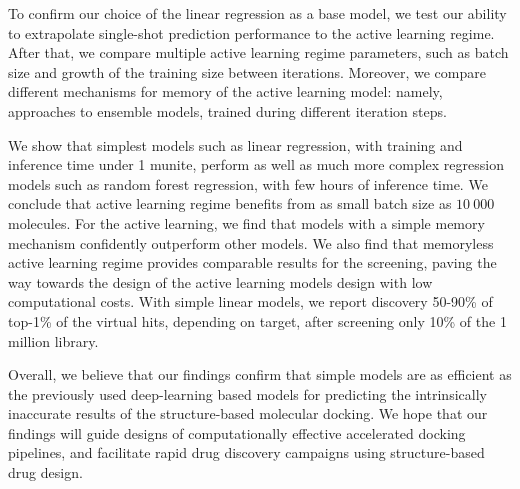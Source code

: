 To confirm our choice of the linear regression as a base model, we test our ability to extrapolate single-shot prediction performance to the active learning regime. After that, we compare multiple active learning regime parameters, such as batch size and growth of the training size between iterations. Moreover, we compare different mechanisms for memory of the active learning model: namely, approaches to ensemble models, trained during different iteration steps.

We show that simplest models such as linear regression, with training and inference time under 1 munite, perform as well as much more complex regression models such as random forest regression, with few hours of inference time. We conclude that active learning regime benefits from as small batch size as $10\ 000$ molecules. For the active learning, we find that models with a simple memory mechanism confidently outperform other models. We also find that memoryless active learning regime provides comparable results for the screening, paving the way towards the design of the active learning models design with low computational costs. With simple linear models, we report discovery 50-90\% of top-1\% of the virtual hits, depending on target, after screening only 10\% of the 1 million library.
 
Overall, we believe that our findings confirm that simple models are as efficient as the previously used deep-learning based models for predicting the intrinsically inaccurate results of the structure-based molecular docking. We hope that our findings will guide designs of computationally effective accelerated docking pipelines, and facilitate rapid drug discovery campaigns using structure-based drug design.

